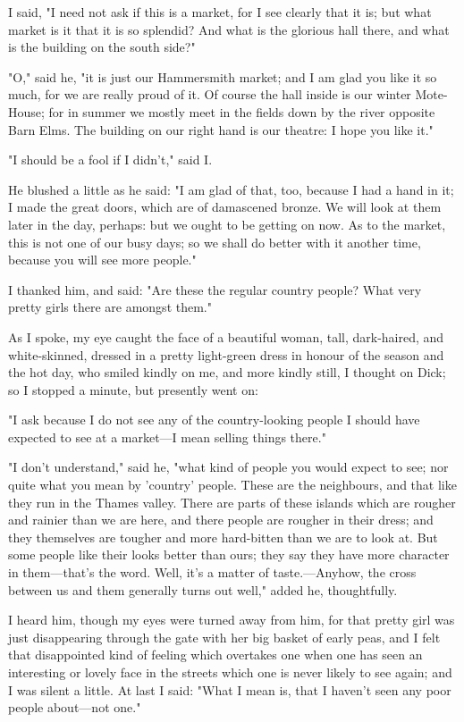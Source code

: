 I said, "I need not ask if this is a market, for I see clearly that it
is; but what market is it that it is so splendid? And what is the
glorious hall there, and what is the building on the south side?"

"O," said he, "it is just our Hammersmith market; and I am glad you like
it so much, for we are really proud of it. Of course the hall inside is
our winter Mote-House; for in summer we mostly meet in the fields down
by the river opposite Barn Elms. The building on our right hand is our
theatre: I hope you like it."

"I should be a fool if I didn't," said I.

He blushed a little as he said: "I am glad of that, too, because I had a
hand in it; I made the great doors, which are of damascened bronze. We
will look at them later in the day, perhaps: but we ought to be getting
on now. As to the market, this is not one of our busy days; so we shall
do better with it another time, because you will see more people."

I thanked him, and said: "Are these the regular country people? What
very pretty girls there are amongst them."

As I spoke, my eye caught the face of a beautiful woman, tall,
dark-haired, and white-skinned, dressed in a pretty light-green dress in
honour of the season and the hot day, who smiled kindly on me, and more
kindly still, I thought on Dick; so I stopped a minute, but presently
went on:

"I ask because I do not see any of the country-looking people I should
have expected to see at a market---I mean selling things there."

"I don't understand," said he, "what kind of people you would expect to
see; nor quite what you mean by 'country' people. These are the
neighbours, and that like they run in the Thames valley. There are parts
of these islands which are rougher and rainier than we are here, and
there people are rougher in their dress; and they themselves are tougher
and more hard-bitten than we are to look at. But some people like their
looks better than ours; they say they have more character in
them---that's the word. Well, it's a matter of taste.---Anyhow, the
cross between us and them generally turns out well," added he,
thoughtfully.

I heard him, though my eyes were turned away from him, for that pretty
girl was just disappearing through the gate with her big basket of early
peas, and I felt that disappointed kind of feeling which overtakes one
when one has seen an interesting or lovely face in the streets which one
is never likely to see again; and I was silent a little. At last I said:
"What I mean is, that I haven't seen any poor people about---not one."

